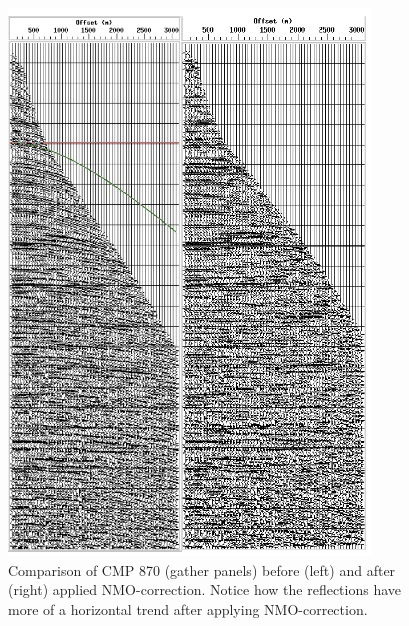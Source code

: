 \documentclass[10pt,a4paper]{article}
\begin{document}
\begin{figure}[H]
\includegraphics[width=\textwidth]{beforeAfter_NMOcorr_870.jpg}
\caption{Comparison of CMP 870 (gather panels) before (left) and after (right) applied NMO-correction. Notice how the reflections have more of a horizontal trend after applying NMO-correction.}
\label{NMO870}
\end{figure}
\end{document}
